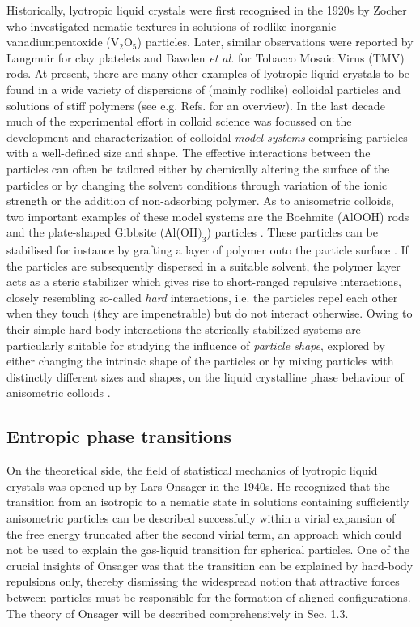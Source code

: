 \documentclass[amssymb]{revtex4}
\begin{document}
Historically, lyotropic liquid crystals were first recognised in the 1920s by Zocher \cite{Zocher}
who investigated nematic textures in solutions of rodlike inorganic vanadiumpentoxide (V$_{2}$O$_{5}$) particles.
Later, similar observations were reported by Langmuir \cite{Langmuir} for clay platelets 
and Bawden {\em et al.} \cite{Bawden,Bernal} for Tobacco Mosaic Virus (TMV) rods.   
At present, there are many other examples of lyotropic liquid crystals to be found in a wide  
variety of dispersions of (mainly rodlike) colloidal particles and solutions of stiff polymers
(see e.g. Refs. \cite{Vroege92,Gabrieloverzicht} for an overview).
In the last decade much of the experimental effort in colloid science
was focussed on the development and characterization of colloidal {\em model systems} comprising particles
with a well-defined size and shape. The effective interactions between the particles can often be tailored
either by chemically altering the surface of the particles or by changing the solvent  
conditions through variation of the ionic strength or the addition of non-adsorbing polymer.
As to anisometric colloids, two  important examples of these model systems are the  Boehmite  (AlOOH)  rods
\cite{Buiningwater,vanBruggen}
and the plate-shaped  Gibbsite (Al(OH$)_{3}$) particles \cite{Wierenga}. 
These particles can be stabilised for instance by grafting a layer of polymer onto the particle surface  
 \cite{vanBruggenPIB,vanderKooij}. If the particles are subsequently dispersed in a suitable solvent, 
the polymer layer acts as a steric stabilizer which gives rise to short-ranged repulsive interactions, 
closely resembling so-called {\em hard} interactions, i.e. the particles repel each other when they touch (they are 
impenetrable) but do not interact otherwise. 
Owing to their simple hard-body interactions the sterically stabilized systems  
are particularly suitable for studying the influence of {\em particle shape}, explored by either
changing the intrinsic shape of the particles or by mixing particles with distinctly different sizes and shapes,
on the liquid crystalline phase behaviour of anisometric colloids \cite{felixthesis}. 		

\subsection{Entropic phase transitions}

On the theoretical side, the field of statistical mechanics of lyotropic
liquid crystals  was opened up by Lars Onsager in the 1940s. He recognized that the transition
from an isotropic to a nematic state in solutions containing sufficiently anisometric particles 
can be described successfully  within a virial expansion of the free energy truncated after
the second virial term, an approach which could not be used to explain the gas-liquid transition for spherical particles.
 One of the crucial insights of Onsager was that the transition
can be explained by hard-body repulsions only, thereby dismissing the widespread notion
that attractive forces between particles  must be responsible for the formation of
 aligned configurations. The theory of Onsager will be described comprehensively in  Sec. 1.3.
\end{document}
